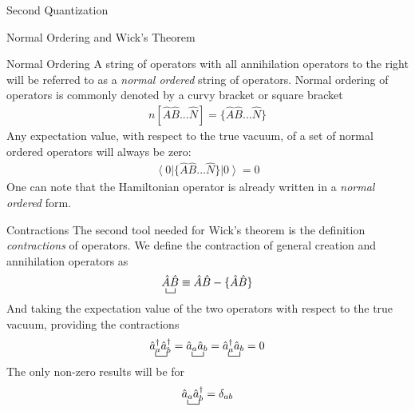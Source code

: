 \documentclass[twoside,english]{uiofysmaster}
\begin{document}
\begin{chapter}{Second Quantization}
\begin{section}{Normal Ordering and Wick's Theorem}
\begin{subsection}{Normal Ordering}
			A string of operators with all annihilation operators to the right will be referred to as a \textit{normal ordered} string of operators. Normal ordering of operators is commonly denoted by a curvy bracket or square bracket
			\begin{align}
				n[ \hat A \hat B ... \hat N ] = \{ \hat A \hat B ... \hat N \}
			\end{align}
			Any expectation value, with respect to the true vacuum, of a set of normal ordered operators will always be zero:
			\begin{align}
				\left< 0 \right| \{ \hat A \hat B ... \hat N \} \left| 0 \right> = 0 
				\label{NormalOrdering1}
			\end{align}
			One can note that the Hamiltonian operator is already written in a \textit{normal ordered} form. 
		\end{subsection}

		\begin{subsection}{Contractions}
			The second tool needed for Wick's theorem is the definition \textit{contractions} of operators. We define the contraction of general creation and annihilation operators as 
			\begin{align}
				\bcontraction{}{\hat A}{}{\hat B} 
				\hat A \hat B
				\equiv \hat A \hat B - \{ \hat A \hat B \}
			\end{align}
			And taking the expectation value of the two operators with respect to the true vacuum, providing the contractions
			\begin{align}
				\bcontraction{}{\hat a_a^\dagger}{}{\hat a_b^\dagger}
				\hat a_a^\dagger \hat a_b^\dagger 
				= 
				\bcontraction{}{\hat a_a}{}{\hat a_b}
				\hat a_a \hat a_b
				= 
				\bcontraction{}{\hat a_a^\dagger}{}{\hat a_b}
				\hat a_a^\dagger \hat a_b
				= 0 
			\end{align}
			The only non-zero results will be for 
			\begin{align}
				\bcontraction{}{\hat a_a}{}{\hat a_b}
				\hat a_a \hat a_b
				^\dagger = \delta_{ab}
			\end{align}
		\end{subsection}
	

\end{section}
\end{chapter}
\end{document}
